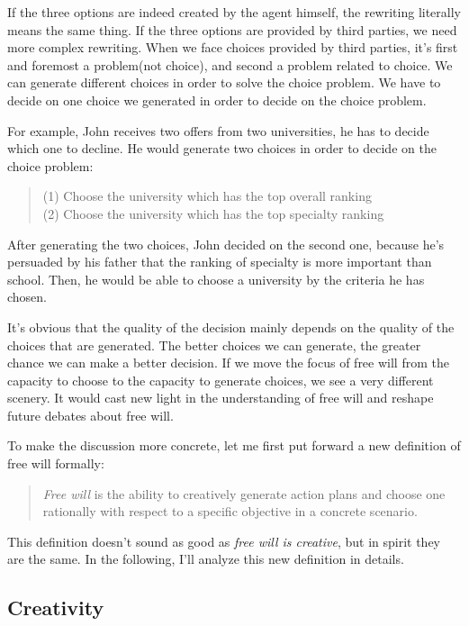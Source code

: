 If the three options are indeed created by the agent himself, the rewriting literally means the same thing. If the three options are provided by third parties, we need more complex rewriting. When we face choices provided by third parties, it's first and foremost a problem(not choice), and second a problem related to choice. We can generate different choices in order to solve the choice problem. We have to decide on one choice we generated in order to decide on the choice problem.

For example, John receives two offers from two universities, he has to decide which one to decline. He would generate two choices in order to decide on the choice problem:

\begin{quote}
(1) Choose the university which has the top overall ranking \\
(2) Choose the university which has the top specialty ranking
\end{quote}

After generating the two choices, John decided on the second one, because he's persuaded by his father that the ranking of specialty is more important than school. Then, he would be able to choose a university by the criteria he has chosen.

It's obvious that the quality of the decision mainly depends on the quality of the choices that are generated. The better choices we can generate, the greater chance we can make a better decision. If we move the focus of free will from the capacity to choose to the capacity to generate choices, we see a very different scenery. It would cast new light in the understanding of free will and reshape future debates about free will.

To make the discussion more concrete, let me first put forward a new definition of free will formally:

\begin{quote}
\emph{Free will} is the ability to creatively generate action plans and choose one rationally with respect to a specific objective in a concrete scenario.
\end{quote}

This definition doesn't sound as good as \emph{free will is creative}, but in spirit they are the same. In the following, I'll analyze this new definition in details.

\subsection{Creativity}

